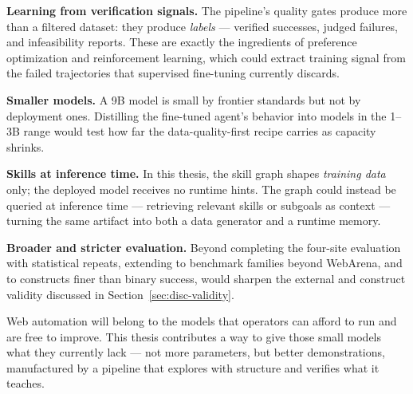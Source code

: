 \textbf{Learning from verification signals.} The pipeline's quality gates
produce more than a filtered dataset: they produce \emph{labels} ---
verified successes, judged failures, and infeasibility reports. These are
exactly the ingredients of preference optimization and reinforcement
learning, which could extract training signal from the failed trajectories
that supervised fine-tuning currently discards.

\textbf{Smaller models.} A 9B model is small by frontier standards but not
by deployment ones. Distilling the fine-tuned agent's behavior into models
in the 1--3B range would test how far the data-quality-first recipe carries
as capacity shrinks.

\textbf{Skills at inference time.} In this thesis, the skill graph shapes
\emph{training data} only; the deployed model receives no runtime hints. The
graph could instead be queried at inference time --- retrieving relevant
skills or subgoals as context --- turning the same artifact into both a data
generator and a runtime memory.

\textbf{Broader and stricter evaluation.} Beyond completing the four-site
evaluation with statistical repeats, extending to benchmark families beyond
WebArena, and to constructs finer than binary success, would sharpen the
external and construct validity discussed in
Section~\ref{sec:disc-validity}.

\vspace{1em}
\noindent
Web automation will belong to the models that operators can afford to run
and are free to improve. This thesis contributes a way to give those small
models what they currently lack --- not more parameters, but better
demonstrations, manufactured by a pipeline that explores with structure and
verifies what it teaches.

